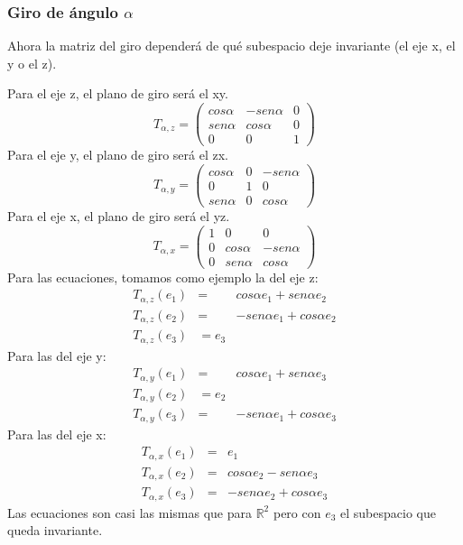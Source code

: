 \documentclass [a4paper,12pt]{article}
\begin{document}
\subsubsection{Giro de ángulo $\alpha$}
Ahora la matriz del giro dependerá de qué subespacio deje invariante (el eje x, el y o el z).\par
Para el eje z, el plano de giro será el xy.
$$
T_{\alpha, z}=\begin{pmatrix}
cos \alpha&- sen \alpha &0\\
sen \alpha&cos \alpha&0\\
0&0&1
\end{pmatrix}
$$
Para el eje y, el plano de giro será el zx.
$$
T_{\alpha, y}=\begin{pmatrix}
cos \alpha&0 &- sen \alpha\\
0&1&0\\
sen \alpha&0&cos \alpha
\end{pmatrix}
$$
Para el eje x, el plano de giro será el yz.
$$
T_{\alpha, x}=\begin{pmatrix}
1&0 &0\\
0&cos \alpha&- sen \alpha\\
0&sen \alpha&cos \alpha
\end{pmatrix}
$$
Para las ecuaciones, tomamos como ejemplo la del eje z:
\begin{eqnarray}
T_{\alpha, z} (e_1)& = & cos\alpha  e_1 + sen\alpha  e_2 \\
T_{\alpha, z} (e_2)& = & -sen\alpha  e_1 + cos\alpha  e_2\\
T_{\alpha, z} (e_3)&= e_3
\end{eqnarray}
Para las del eje y:
\begin{eqnarray}
T_{\alpha, y} (e_1)& = & cos\alpha  e_1 + sen\alpha  e_3 \\
T_{\alpha, y} (e_2)& =  e_2\\
T_{\alpha, y} (e_3)&= & -sen\alpha  e_1 + cos\alpha  e_3
\end{eqnarray}
Para las del eje x:
\begin{eqnarray}
T_{\alpha, x} (e_1)& = & e_1\\
T_{\alpha, x} (e_2)& = & cos\alpha  e_2 - sen\alpha  e_3 \\
T_{\alpha, x} (e_3)&= & -sen\alpha  e_2 + cos\alpha  e_3
\end{eqnarray}
Las ecuaciones son casi las mismas que para $\mathbb{R}^2$ pero con $e_3$ el subespacio que queda invariante.\par
\end{document}
